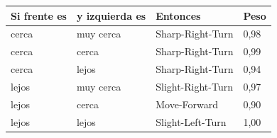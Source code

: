 \begin{tabular}{llll}
\toprule
Si frente es & y izquierda es & Entonces & Peso \\
\midrule
cerca & muy cerca & Sharp-\allowbreak Right-\allowbreak Turn & 0,98 \\
cerca & cerca & Sharp-\allowbreak Right-\allowbreak Turn & 0,99 \\
cerca & lejos & Sharp-\allowbreak Right-\allowbreak Turn & 0,94 \\
lejos & muy cerca & Slight-\allowbreak Right-\allowbreak Turn & 0,97 \\
lejos & cerca & Move-\allowbreak Forward & 0,90 \\
lejos & lejos & Slight-\allowbreak Left-\allowbreak Turn & 1,00 \\
\bottomrule
\end{tabular}
